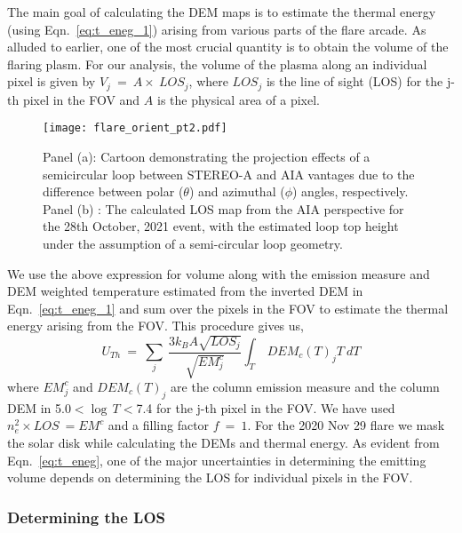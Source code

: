 The main goal of calculating the DEM maps is to estimate the thermal energy (using Eqn.~\ref{eq:t_eneg_1}) arising from various parts of the flare arcade. As alluded to earlier, one of the most crucial quantity is to obtain the volume of the flaring plasm. For our analysis, the volume of the plasma along an individual pixel is given by $V_{j}~=~A\times~LOS_{j}$, where $LOS_{j}$ is the line of sight (LOS) for the j-th pixel in the FOV and $A$ is the physical area of a pixel.

\begin{figure}[ht!][!h]
    \centering
    \texttt{[image: flare\_orient\_pt2.pdf]}
    \caption{Panel (a): Cartoon demonstrating the projection effects of a semicircular loop between STEREO-A and AIA vantages due to the difference between polar ($\theta$) and azimuthal ($\phi$) angles, respectively. Panel (b) : The calculated LOS map from the AIA perspective for the 28th October, 2021 event, with the estimated loop top height under the assumption of a semi-circular loop geometry.}
    \label{fig:flare_orient_2}
\end{figure}

We use the above expression for volume along with the emission measure and DEM weighted temperature estimated from the inverted DEM in Eqn.~\ref{eq:t_eneg_1} and sum over the pixels in the FOV to estimate the thermal energy arising from the FOV. This procedure gives us,
\begin{equation}
    U_{Th}~=~\sum_{j}~\frac{3k_{B}A\sqrt{LOS_{j}}}{\sqrt{EM^{c}_{j}}}\int_{T}~DEM_{c}(T)_{j}T~dT
    \label{eq:t_eneg}
\end{equation}
where $EM^{c}_{j}$ and $DEM_{c}(T)_{j}$ are the column emission measure and the column DEM in 5.0$<$$\log\,T$$<$7.4 for the j-th pixel in the FOV. We have used $n_{e}^{2}\times LOS~=EM^{c}$ and a filling factor $\textit{f}~=~1$. For the 2020 Nov 29 flare we mask the solar disk while calculating the DEMs and thermal energy. As evident from Eqn.~\ref{eq:t_eneg}, one of the major uncertainties in determining the emitting volume depends on determining the LOS for individual pixels in the FOV. 

\subsubsection{Determining the LOS}\label{sec:los}
 
